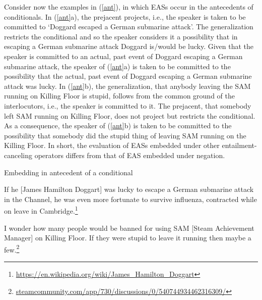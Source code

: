 \documentclass[11pt,fleqn]{article}
\newcommand{\6}{\mbox{$[\hspace*{-.6mm}[$}}
\newcommand{\9}{\mbox{$]\hspace*{-.6mm}]$}}
\begin{document}
Consider now the examples in (\ref{ant}), in which EASs occur in the antecedents of conditionals. In (\ref{ant}a), the prejacent projects, i.e., the speaker is taken to be committed to `Doggard escaped a German submarine attack'. The generalization restricts the conditional and so the speaker considers it a possibility that in escaping a German submarine attack Doggard is/would be lucky. Given that the speaker is committed to an actual, past event of Doggard escaping a German submarine attack, the speaker of (\ref{ant}a) is taken to be committed to the possibility that the actual, past event of Doggard escaping a German submarine attack was lucky. In (\ref{ant}b), the generalization, that anybody leaving the SAM running on Killing Floor is stupid, follows from the common ground of the interlocutors, i.e., the speaker is committed to it. The prejacent, that somebody left SAM running on Killing Floor, does not project but restricts the conditional. As a consequence, the speaker of (\ref{ant}b) is taken to be committed to the possibility that somebody did the stupid thing of leaving SAM running on the Killing Floor. In short, the evaluation of EASs embedded under other entailment-canceling operators differs from that of EAS embedded under negation.

\begin{exe}
\ex\label{ant} Embedding in antecedent of a conditional
\begin{xlist}

\ex If he [James Hamilton Doggart] was lucky to escape a German submarine attack in the Channel, he was even more fortunate to survive influenza, contracted while on leave in Cambridge.\footnote{\url{https://en.wikipedia.org/wiki/James_Hamilton_Doggart}}


\ex 
\begin{xlist}
 I wonder how many people would be banned for using SAM [Steam Achievement Manager] on Killing Floor.
 If they were stupid to leave it running then maybe a few.\footnote{\url{steamcommunity.com/app/730/discussions/0/540744934462316309/}}

\end{xlist} 
\end{xlist}
\end{exe}
\end{document}

